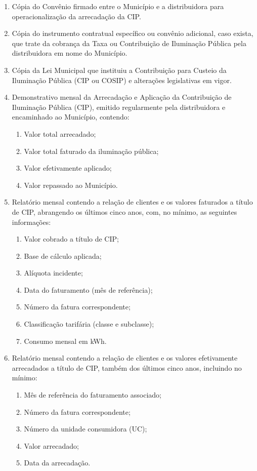 \begin{enumerate}[resume]
\item Cópia do Convênio firmado entre o Município e a distribuidora para operacionalização da arrecadação da CIP.
\item Cópia do instrumento contratual específico ou convênio adicional, caso exista, que trate da cobrança da Taxa ou Contribuição de Iluminação Pública pela distribuidora em nome do Município.
\item Cópia da Lei Municipal que instituiu a Contribuição para Custeio da Iluminação Pública (CIP ou COSIP) e alterações legislativas em vigor.
\item Demonstrativo mensal da Arrecadação e Aplicação da Contribuição de Iluminação Pública (CIP), emitido regularmente pela distribuidora e encaminhado ao Município, contendo:
\begin{enumerate}[resume]
  \item Valor total arrecadado;
  \item Valor total faturado da iluminação pública;
  \item Valor efetivamente aplicado;
  \item Valor repassado ao Município.
\end{enumerate}

\item Relatório mensal contendo a relação de clientes e os valores faturados a título de CIP, abrangendo os últimos cinco anos, com, no mínimo, as seguintes informações:
\begin{enumerate}[resume]
  \item Valor cobrado a título de CIP;
  \item Base de cálculo aplicada;
  \item Alíquota incidente;
  \item Data do faturamento (mês de referência);
  \item Número da fatura correspondente;
  \item Classificação tarifária (classe e subclasse);
  \item Consumo mensal em kWh.
\end{enumerate}

\item Relatório mensal contendo a relação de clientes e os valores efetivamente arrecadados a título de CIP, também dos últimos cinco anos, incluindo no mínimo:
\begin{enumerate}[resume]
  \item Mês de referência do faturamento associado;
  \item Número da fatura correspondente;
  \item Número da unidade consumidora (UC);
  \item Valor arrecadado;
  \item Data da arrecadação.
\end{enumerate}


\end{enumerate}
